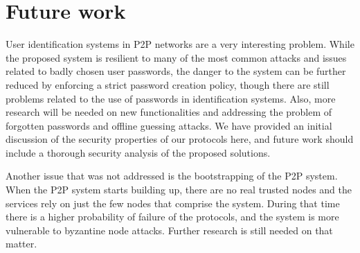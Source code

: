 



\section{Future work}


User identification systems in P2P networks are a very interesting problem.
While the proposed system is resilient to many of the most common attacks
and issues related to badly chosen user passwords, the danger to the system can
be further reduced by enforcing a strict password creation policy, though there are still problems related to the use of
passwords in identification systems. 
Also, more research will be needed on new functionalities and addressing the
problem of forgotten passwords and offline guessing attacks.
We have provided an initial discussion of the security properties of our
protocols here, and future work should include a thorough security analysis of
the proposed solutions.

Another issue that was not addressed is the bootstrapping of the P2P system.
When the P2P system starts building up, there are no real trusted
nodes and the services rely on just the few nodes that comprise the
system. During that time there is a higher probability of failure of the protocols, and the system is
more vulnerable to byzantine node attacks. Further research is still needed on
that matter.


%

%
%


